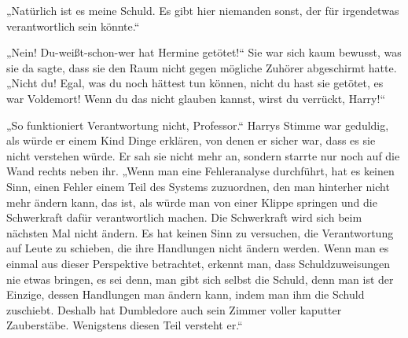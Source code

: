 „Natürlich ist es meine Schuld. Es gibt hier niemanden sonst, der für irgendetwas verantwortlich sein könnte.“

„Nein! Du-weißt-schon-wer hat Hermine getötet!“ Sie war sich kaum bewusst, was sie da sagte, dass sie den Raum nicht gegen mögliche Zuhörer abgeschirmt hatte.
„Nicht du! Egal, was du noch hättest tun können, nicht du hast sie getötet, es war Voldemort! Wenn du das nicht glauben kannst, wirst du verrückt, Harry!“

„So funktioniert Verantwortung nicht, Professor.“ Harrys Stimme war geduldig, als würde er einem Kind Dinge erklären, von denen er sicher war, dass es sie nicht verstehen würde. Er sah sie nicht mehr an, sondern starrte nur noch auf die Wand rechts neben ihr.
„Wenn man eine Fehleranalyse durchführt, hat es keinen Sinn, einen Fehler einem Teil des Systems zuzuordnen, den man hinterher nicht mehr ändern kann, das ist, als würde man von einer Klippe springen und die Schwerkraft dafür verantwortlich machen. Die Schwerkraft wird sich beim nächsten Mal nicht ändern. Es hat keinen Sinn zu versuchen, die Verantwortung auf Leute zu schieben, die ihre Handlungen nicht ändern werden. Wenn man es einmal aus dieser Perspektive betrachtet, erkennt man, dass Schuldzuweisungen nie etwas bringen, es sei denn, man gibt sich selbst die Schuld, denn man ist der Einzige, dessen Handlungen man ändern kann, indem man ihm die Schuld zuschiebt. Deshalb hat Dumbledore auch sein Zimmer voller kaputter Zauberstäbe. Wenigstens diesen Teil versteht er.“

